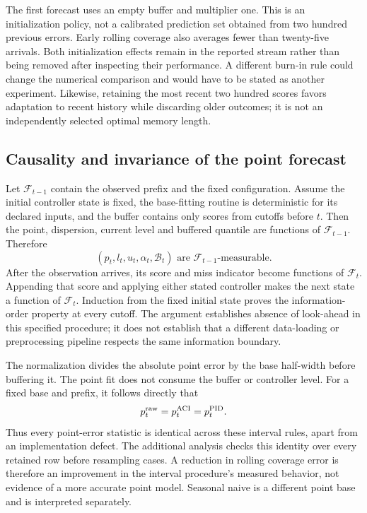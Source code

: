 The first forecast uses an empty buffer and multiplier one. This is an initialization policy, not a calibrated prediction set obtained from two hundred previous errors. Early rolling coverage also averages fewer than twenty-five arrivals. Both initialization effects remain in the reported stream rather than being removed after inspecting their performance. A different burn-in rule could change the numerical comparison and would have to be stated as another experiment. Likewise, retaining the most recent two hundred scores favors adaptation to recent history while discarding older outcomes; it is not an independently selected optimal memory length.

\subsection{Causality and invariance of the point forecast}
Let $\mathcal F_{t-1}$ contain the observed prefix and the fixed configuration. Assume the initial controller state is fixed, the base-fitting routine is deterministic for its declared inputs, and the buffer contains only scores from cutoffs before $t$. Then the point, dispersion, current level and buffered quantile are functions of $\mathcal F_{t-1}$. Therefore
\begin{equation}\label{eq:replay-causal}
 (p_t,l_t,u_t,\alpha_t,\mathcal B_t)\text{ are }\mathcal F_{t-1}\text{-measurable}.
\end{equation}
After the observation arrives, its score and miss indicator become functions of $\mathcal F_t$. Appending that score and applying either stated controller makes the next state a function of $\mathcal F_t$. Induction from the fixed initial state proves the information-order property at every cutoff. The argument establishes absence of look-ahead in this specified procedure; it does not establish that a different data-loading or preprocessing pipeline respects the same information boundary.

The normalization divides the absolute point error by the base half-width before buffering it. The point fit does not consume the buffer or controller level. For a fixed base and prefix, it follows directly that
\begin{equation}\label{eq:replay-point-identity}
 p_t^{\rm raw}=p_t^{\rm ACI}=p_t^{\rm PID}.
\end{equation}
Thus every point-error statistic is identical across these interval rules, apart from an implementation defect. The additional analysis checks this identity over every retained row before resampling cases. A reduction in rolling coverage error is therefore an improvement in the interval procedure's measured behavior, not evidence of a more accurate point model. Seasonal naive is a different point base and is interpreted separately.

